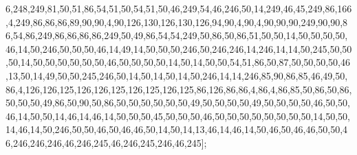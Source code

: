 6,248,249,81,50,51,86,54,51,50,54,51,50,46,249,54,46,246,50,14,249,46,45,249,86,166,4,249,86,86,86,89,90,90,4,90,126,130,126,130,126,94,90,4,90,4,90,90,90,249,90,90,86,54,86,249,86,86,86,86,249,50,49,86,54,54,249,50,86,50,86,51,50,50,14,50,50,50,50,46,14,50,246,50,50,50,46,14,49,14,50,50,50,246,50,246,246,14,246,14,14,50,245,50,50,50,14,50,50,50,50,50,50,46,50,50,50,50,14,50,14,50,50,54,51,86,50,87,50,50,50,50,46,13,50,14,49,50,50,245,246,50,14,50,14,50,14,50,246,14,14,246,85,90,86,85,46,49,50,86,4,126,126,125,126,126,125,126,125,126,125,86,126,86,86,4,86,4,86,85,50,86,50,86,50,50,50,49,86,50,90,50,86,50,50,50,50,50,50,49,50,50,50,50,49,50,50,50,50,46,50,50,46,14,50,50,14,46,14,46,14,50,50,50,45,50,50,50,46,50,50,50,50,50,50,50,50,14,50,50,14,46,14,50,246,50,50,46,50,46,46,50,14,50,14,13,46,14,46,14,50,46,50,46,46,50,50,46,246,246,246,46,246,245,46,246,245,246,46,245];

